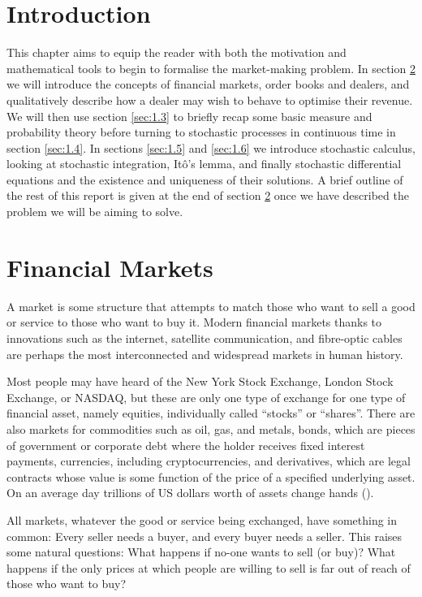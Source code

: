 \section{Introduction}
This chapter aims to equip the reader with both the motivation and mathematical 
tools to begin to formalise the market-making problem. In section \ref{sec:1.2}
we will introduce the concepts of financial markets, order books and dealers, and 
qualitatively describe how a dealer may wish to behave to optimise their revenue. We
will then use section \ref{sec:1.3} to briefly recap some basic measure and probability 
theory before turning to stochastic processes in continuous time in section 
\ref{sec:1.4}. In sections \ref{sec:1.5} and \ref{sec:1.6} we introduce stochastic 
calculus, looking at stochastic integration, It\^{o}'s lemma, and finally stochastic 
differential equations and the existence and uniqueness of their solutions. A brief 
outline of the rest of this report is given at the end of section \ref{sec:1.2}
once we have described the problem we will be aiming to solve.

\section{Financial Markets}\label{sec:1.2}
A market is some structure that attempts to match those who want to 
sell a good or service to those who want to buy it. Modern financial markets 
thanks to innovations such as the internet, satellite communication, and 
fibre-optic cables are perhaps the most interconnected and widespread markets in 
human history. 

Most people may have heard of the New York Stock Exchange, London Stock Exchange, 
or NASDAQ, but these are only one type of exchange for one type of financial asset, 
namely equities, individually called ``stocks'' 
or ``shares''. There are also markets for commodities such as oil, gas, and metals, bonds, 
which are pieces of government or corporate 
debt where the holder receives fixed interest payments, currencies, including 
cryptocurrencies, and derivatives, which are legal contracts whose value is some 
function of the price of a specified underlying asset. On an average day
trillions of US dollars worth of assets change hands (\cite{ADV}).

All markets, whatever the good or service being exchanged, have something in common: 
Every seller needs a buyer, and every buyer needs a seller. This raises some 
natural questions: What happens if no-one wants to sell (or buy)? What happens if 
the only prices at which people are willing to sell is far out of reach of those 
who want to buy? 

